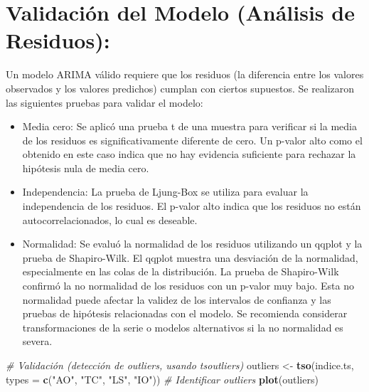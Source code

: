 \documentclass[
]{book}
\newenvironment{Shaded}{\begin{snugshade}}{\end{snugshade}}
\newcommand{\AttributeTok}[1]{\textcolor[rgb]{0.13,0.29,0.53}{#1}}
\newcommand{\CommentTok}[1]{\textcolor[rgb]{0.56,0.35,0.01}{\textit{#1}}}
\newcommand{\FunctionTok}[1]{\textcolor[rgb]{0.13,0.29,0.53}{\textbf{#1}}}
\newcommand{\NormalTok}[1]{#1}
\newcommand{\OtherTok}[1]{\textcolor[rgb]{0.56,0.35,0.01}{#1}}
\newcommand{\StringTok}[1]{\textcolor[rgb]{0.31,0.60,0.02}{#1}}
\begin{document}
\section{Validación del Modelo (Análisis de Residuos):}\label{validaciuxf3n-del-modelo-anuxe1lisis-de-residuos}

Un modelo ARIMA válido requiere que los residuos (la diferencia entre los valores observados y los valores predichos) cumplan con ciertos supuestos. Se realizaron las siguientes pruebas para validar el modelo:

\begin{itemize}
\item
  Media cero: Se aplicó una prueba t de una muestra para verificar si la media de los residuos es significativamente diferente de cero. Un p-valor alto como el obtenido en este caso indica que no hay evidencia suficiente para rechazar la hipótesis nula de media cero.
\item
  Independencia: La prueba de Ljung-Box se utiliza para evaluar la independencia de los residuos. El p-valor alto indica que los residuos no están autocorrelacionados, lo cual es deseable.
\item
  Normalidad: Se evaluó la normalidad de los residuos utilizando un qqplot y la prueba de Shapiro-Wilk. El qqplot muestra una desviación de la normalidad, especialmente en las colas de la distribución. La prueba de Shapiro-Wilk confirmó la no normalidad de los residuos con un p-valor muy bajo. Esta no normalidad puede afectar la validez de los intervalos de confianza y las pruebas de hipótesis relacionadas con el modelo. Se recomienda considerar transformaciones de la serie o modelos alternativos si la no normalidad es severa.
\end{itemize}

\begin{Shaded}
\begin{Highlighting}[]
\CommentTok{\# Validación (detección de outliers, usando \textquotesingle{}tsoutliers\textquotesingle{})}
\NormalTok{outliers }\OtherTok{\textless{}{-}} \FunctionTok{tso}\NormalTok{(indice.ts, }\AttributeTok{types =} \FunctionTok{c}\NormalTok{(}\StringTok{"AO"}\NormalTok{, }\StringTok{"TC"}\NormalTok{, }\StringTok{"LS"}\NormalTok{, }\StringTok{"IO"}\NormalTok{))  }\CommentTok{\# Identificar outliers}
\FunctionTok{plot}\NormalTok{(outliers)}
\end{Highlighting}
\end{Shaded}
\end{document}
